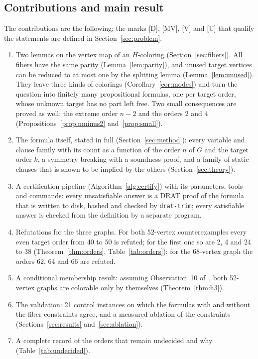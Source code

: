 \documentclass[11pt]{article}
\theoremstyle{definition}
\theoremstyle{remark}
\newcommand{\evD}{\textnormal{[D]}}
\newcommand{\evMV}{\textnormal{[MV]}}
\newcommand{\evV}{\textnormal{[V]}}
\newcommand{\evU}{\textnormal{[U]}}
\begin{document}
\subsection{Contributions and main result}

The contributions are the following; the marks \evD, \evMV, \evV{} and \evU{} that qualify the
statements are defined in Section~\ref{sec:problem}.
\begin{enumerate}
\item Two lemmas on the vertex map of an $H$-coloring (Section~\ref{sec:fibers}). All fibers have the same
parity (Lemma~\ref{lem:parity}), and unused target vertices can be reduced to at most one by the splitting
lemma (Lemma~\ref{lem:unused}). They leave three kinds of colorings (Corollary~\ref{cor:modes}) and turn
the question into finitely many propositional formulas, one per target order, whose unknown target has
no part left free. Two small consequences are proved as well: the extreme order $n-2$ and the orders 2
and 4 (Propositions~\ref{prop:nminus2} and~\ref{prop:small}).
\item The formula itself, stated in full (Section~\ref{sec:method}): every variable and clause family with its
count as a function of the order $n$ of $G$ and the target order $k$, a symmetry breaking with a soundness
proof, and a family of static clauses that is shown to be implied by the others
(Section~\ref{sec:theory}).
\item A certification pipeline (Algorithm~\ref{alg:certify}) with its parameters, tools and commands: every
unsatisfiable answer is a DRAT proof of the formula that is written to disk, hashed and checked by
\texttt{drat-trim}; every satisfiable answer is checked from the definition by a separate program.
\item Refutations for the three graphs. For both 52-vertex counterexamples every even target order from 40
to 50 is refuted; for the first one so are 2, 4 and 24 to 38 (Theorem~\ref{thm:orders},
Table~\ref{tab:orders}); for the 68-vertex graph the orders 62, 64 and 66 are refuted.
\item A conditional membership result: assuming Observation~10 of~\cite{GJMMMU2026}, both 52-vertex
graphs are colorable only by themselves (Theorem~\ref{thm:h3}).
\item The validation: 21 control instances on which the formulas with and without the fiber constraints
agree, and a measured ablation of the constraints (Sections~\ref{sec:results} and~\ref{sec:ablation}).
\item A complete record of the orders that remain undecided and why (Table~\ref{tab:undecided}).
\end{enumerate}
\end{document}
